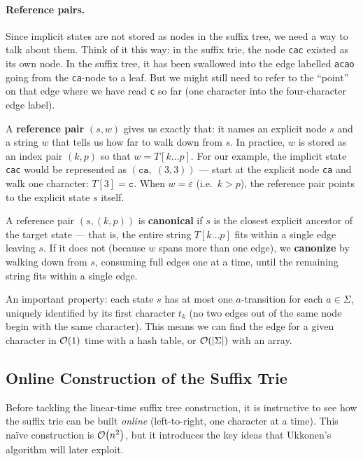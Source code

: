 \paragraph{Reference pairs.}
Since implicit states are not stored as nodes in the suffix tree, we
need a way to talk about them.
Think of it this way: in the suffix trie, the node \texttt{cac} existed
as its own node.
In the suffix tree, it has been swallowed into the edge labelled
\texttt{acao} going from the \texttt{ca}-node to a leaf.
But we might still need to refer to the ``point'' on that edge where we
have read \texttt{c} so far (one character into the four-character edge
label).

A \textbf{reference pair} $(s, w)$ gives us exactly that: it names an
explicit node $s$ and a string $w$ that tells us how far to walk down
from $s$.
In practice, $w$ is stored as an index pair $(k, p)$ so that
$w = T[k \ldots p]$.
For our example, the implicit state \texttt{cac} would be represented
as $(\texttt{ca},\; (3, 3))$ --- start at the explicit node
\texttt{ca} and walk one character: $T[3] = \texttt{c}$.
When $w = \varepsilon$ (i.e.\ $k > p$), the reference pair
points to the explicit state $s$ itself.

A reference pair $(s, (k, p))$ is \textbf{canonical} if $s$ is the
closest explicit ancestor of the target state --- that is, the entire
string $T[k \ldots p]$ fits within a single edge leaving $s$.
If it does not (because $w$ spans more than one edge), we
\textbf{canonize} by walking down from $s$, consuming full edges one at
a time, until the remaining string fits within a single edge.

An important property: each state $s$ has at most one
$a$-transition for each $a \in \Sigma$, uniquely identified by its
first character $t_k$ (no two edges out of the same node begin with
the same character).
This means we can find the edge for a given character in $\mathcal{O}\!\left(1\right)$
time with a hash table, or $\mathcal{O}\!\left(|\Sigma|\right)$ with an array.

\subsection{Online Construction of the Suffix Trie}

Before tackling the linear-time suffix tree construction, it is
instructive to see how the suffix trie can be built \emph{online}
(left-to-right, one character at a time).
This na\"ive construction is $\mathcal{O}\!\left(n^2\right)$, but it introduces the key ideas
that Ukkonen's algorithm will later exploit.


